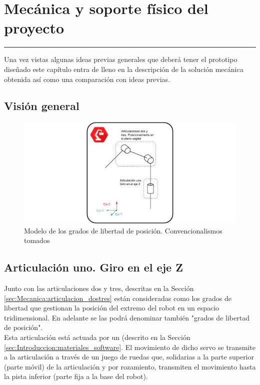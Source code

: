 \chapter{Mecánica y soporte físico del proyecto} \label{chap:Mecanica}
\hrule
\vspace{3mm}

Una vez vistas algunas ideas previas generales que deberá tener el prototipo diseñado este capítulo entra de lleno en la descripción de la solución mecánica obtenida así como una comparación con ideas previas.

\section{Visión general} \label{sec:Mecanica:vision_general}

\begin{figure}[H]
    \centering
    \includegraphics[width=\textwidth]{figuras/Imagenes_Mecanica/modelo_esquematico.jpg}
    \caption{Modelo de los grados de libertad de posición. Convencionalismos tomados}
    \label{fig:Mecanica:convenciones_generales}
\end{figure}

\section{Articulación uno. Giro en el eje Z} \label{sec:Mecanica:articulacion_uno}
    Junto con las articulaciones dos y tres, descritas en la Sección \ref{sec:Mecanica:articulacion_dostres} están consideradas como los grados de libertad que gestionan la posición del extremo del robot en un espacio tridimensional. En adelante se las podrá denominar también "grados de libertad de posición".
    \\

    Esta articulación está actuada por un  (descrito en la Sección \ref{sec:Introduccion:materiales_software}. El movimiento de dicho servo se transmite a la articulación a través de un juego de ruedas que, solidarias a la parte superior (parte móvil) de la articulación y por rozamiento, transmiten el movimiento hasta la pista inferior (parte fija a la base del robot).
    \\

